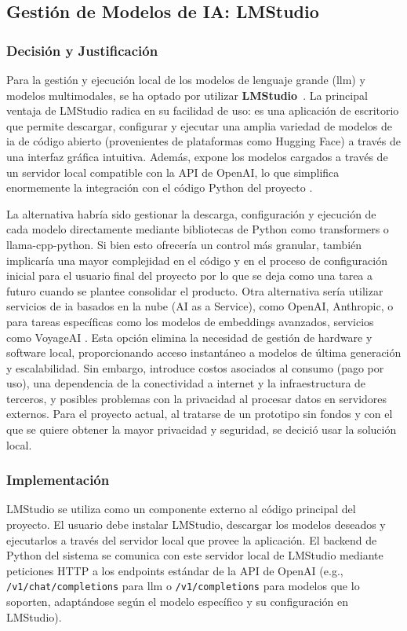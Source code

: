 \subsection{Gestión de Modelos de IA: LMStudio}
\label{subsec:decision_lmstudio}
\subsubsection{Decisión y Justificación}
Para la gestión y ejecución local de los modelos de lenguaje grande (\gls{llm}) y modelos multimodales, se ha optado por utilizar \textbf{LMStudio}~\cite{noauthor_lm_nodate}. La principal ventaja de LMStudio radica en su facilidad de uso: es una aplicación de escritorio que permite descargar, configurar y ejecutar una amplia variedad de modelos de \gls{ia} de código abierto (provenientes de plataformas como Hugging Face) a través de una interfaz gráfica intuitiva. Además, expone los modelos cargados a través de un servidor local compatible con la API de OpenAI, lo que simplifica enormemente la integración con el código Python del proyecto \cite{noauthor_lmstudio-python_nodate}.

La alternativa habría sido gestionar la descarga, configuración y ejecución de cada modelo directamente mediante bibliotecas de Python como transformers o llama-cpp-python. Si bien esto ofrecería un control más granular, también implicaría una mayor complejidad en el código y en el proceso de configuración inicial para el usuario final del proyecto por lo que se deja como una tarea a futuro cuando se plantee consolidar el producto.
Otra alternativa sería utilizar servicios de \gls{ia} basados en la nube (AI as a Service), como OpenAI, Anthropic, o para tareas específicas como los modelos de embeddings avanzados, servicios como VoyageAI \cite{noauthor_voyage_nodate}. Esta opción elimina la necesidad de gestión de hardware y software local, proporcionando acceso instantáneo a modelos de última generación y escalabilidad. Sin embargo, introduce costos asociados al consumo (pago por uso), una dependencia de la conectividad a internet y la infraestructura de terceros, y posibles problemas con la privacidad al procesar datos en servidores externos. Para el proyecto actual, al tratarse de un prototipo sin fondos y con el que se quiere obtener la mayor privacidad y seguridad, se decició usar la solución local.

\subsubsection{Implementación}
LMStudio se utiliza como un componente externo al código principal del proyecto. El usuario debe instalar LMStudio, descargar los modelos deseados y ejecutarlos a través del servidor local que provee la aplicación. El backend de Python del sistema se comunica con este servidor local de LMStudio mediante peticiones HTTP a los endpoints estándar de la API de OpenAI (e.g., \texttt{/v1/chat/completions} para \gls{llm} o \texttt{/v1/completions} para modelos que lo soporten, adaptándose según el modelo específico y su configuración en LMStudio).

